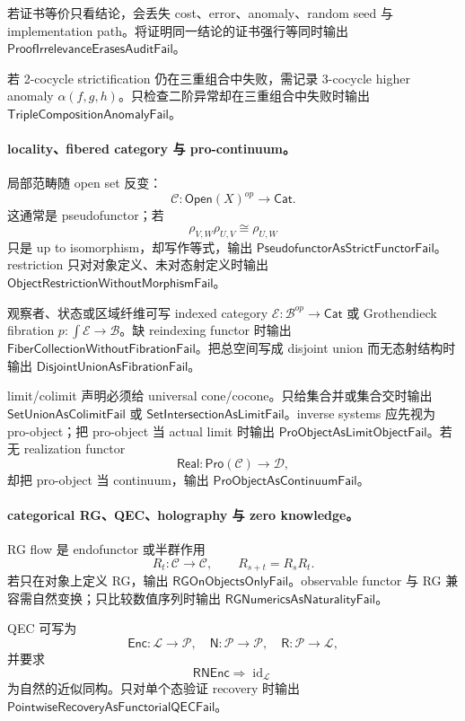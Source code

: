 若证书等价只看结论，会丢失 cost、error、anomaly、random seed 与 implementation path。将证明同一结论的证书强行等同时输出 \(\mathsf{ProofIrrelevanceErasesAuditFail}\)。

若 2-cocycle strictification 仍在三重组合中失败，需记录 3-cocycle higher anomaly \(\alpha(f,g,h)\)。只检查二阶异常却在三重组合中失败时输出 \(\mathsf{TripleCompositionAnomalyFail}\)。

\paragraph{locality、fibered category 与 pro-continuum。}
局部范畴随 open set 反变：
\[
\mathcal C:\mathsf{Open}(X)^{op}\to\mathsf{Cat}.
\]
这通常是 pseudofunctor；若
\[
\rho_{V,W}\rho_{U,V}\cong\rho_{U,W}
\]
只是 up to isomorphism，却写作等式，输出 \(\mathsf{PseudofunctorAsStrictFunctorFail}\)。restriction 只对对象定义、未对态射定义时输出 \(\mathsf{ObjectRestrictionWithoutMorphismFail}\)。

观察者、状态或区域纤维可写 indexed category \(\mathcal E:\mathcal B^{op}\to\mathsf{Cat}\) 或 Grothendieck fibration \(p:\int\mathcal E\to\mathcal B\)。缺 reindexing functor 时输出 \(\mathsf{FiberCollectionWithoutFibrationFail}\)。把总空间写成 disjoint union 而无态射结构时输出 \(\mathsf{DisjointUnionAsFibrationFail}\)。

limit/colimit 声明必须给 universal cone/cocone。只给集合并或集合交时输出 \(\mathsf{SetUnionAsColimitFail}\) 或 \(\mathsf{SetIntersectionAsLimitFail}\)。inverse systems 应先视为 pro-object；把 pro-object 当 actual limit 时输出 \(\mathsf{ProObjectAsLimitObjectFail}\)。若无 realization functor
\[
\mathsf{Real}:\mathsf{Pro}(\mathcal C)\to\mathcal D,
\]
却把 pro-object 当 continuum，输出 \(\mathsf{ProObjectAsContinuumFail}\)。

\paragraph{categorical RG、QEC、holography 与 zero knowledge。}
RG flow 是 endofunctor 或半群作用
\[
R_t:\mathcal C\to\mathcal C,
\qquad
R_{s+t}=R_sR_t.
\]
若只在对象上定义 RG，输出 \(\mathsf{RGOnObjectsOnlyFail}\)。observable functor 与 RG 兼容需自然变换；只比较数值序列时输出 \(\mathsf{RGNumericsAsNaturalityFail}\)。

QEC 可写为
\[
\mathsf{Enc}:\mathcal L\to\mathcal P,\quad
\mathsf N:\mathcal P\to\mathcal P,\quad
\mathsf R:\mathcal P\to\mathcal L,
\]
并要求
\[
\mathsf R\mathsf N\mathsf{Enc}\Rightarrow\operatorname{id}_{\mathcal L}
\]
为自然的近似同构。只对单个态验证 recovery 时输出 \(\mathsf{PointwiseRecoveryAsFunctorialQECFail}\)。

